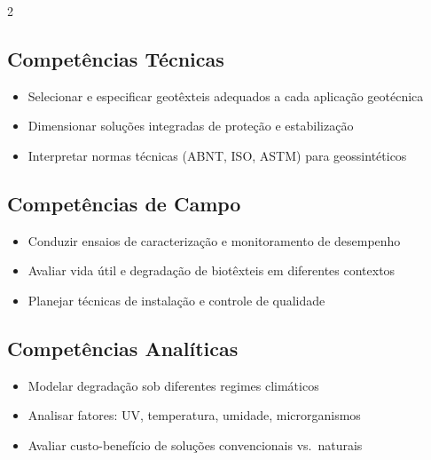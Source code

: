 \documentclass[11pt,a4paper]{article}
\begin{document}
\begin{multicols}{2}

\subsection*{Competências Técnicas}

\begin{itemize}

\item Selecionar e especificar geotêxteis adequados a cada aplicação geotécnica

\item Dimensionar soluções integradas de proteção e estabilização

\item Interpretar normas técnicas (ABNT, ISO, ASTM) para geossintéticos

\end{itemize}

\subsection*{Competências de Campo}

\begin{itemize}

\item Conduzir ensaios de caracterização e monitoramento de desempenho

\item Avaliar vida útil e degradação de biotêxteis em diferentes contextos

\item Planejar técnicas de instalação e controle de qualidade

\end{itemize}

\columnbreak

\subsection*{Competências Analíticas}

\begin{itemize}

\item Modelar degradação sob diferentes regimes climáticos

\item Analisar fatores: UV, temperatura, umidade, microrganismos

\item Avaliar custo-benefício de soluções convencionais vs.\ naturais


\end{itemize}
\end{multicols}
\end{document}
